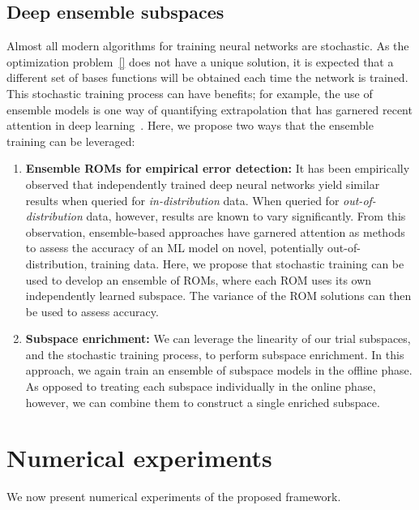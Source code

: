 \documentclass[3p,computermodern,10pt]{elsarticle}
\begin{document}
\subsection{Deep ensemble subspaces}
Almost all modern algorithms for training neural networks are stochastic. As the optimization problem~\eqref{} does not have a unique solution, it is expected that a different set of bases functions will be obtained each time the network is trained. This stochastic training process can have benefits; for example, the use of ensemble models is one way of quantifying extrapolation that has garnered recent attention in deep learning~\cite{deep_ensembles}. Here, we propose two ways that the ensemble training can be leveraged:
\begin{enumerate}
\item \textbf{Ensemble ROMs for empirical error detection:} It has been empirically observed that independently trained deep neural networks yield similar results when queried for \textit{in-distribution} data. When queried for \textit{out-of-distribution} data, however, results are known to vary significantly. From this observation, ensemble-based approaches have garnered attention as methods to assess the accuracy of an ML model on novel, potentially out-of-distribution, training data. Here, we propose that stochastic training can be used to develop an ensemble of ROMs, where each ROM uses its own independently learned subspace. The variance of the ROM solutions can then be used to assess accuracy.   

\item \textbf{Subspace enrichment:} We can leverage the linearity of our trial subspaces, and the stochastic training process, to perform subspace enrichment. In this approach, we again train an ensemble of subspace models in the offline phase. As opposed to treating each subspace individually in the online phase, however, we can combine them to construct a single enriched subspace.
\end{enumerate}  

\section{Numerical experiments}
We now present numerical experiments of the proposed framework.
\end{document}
